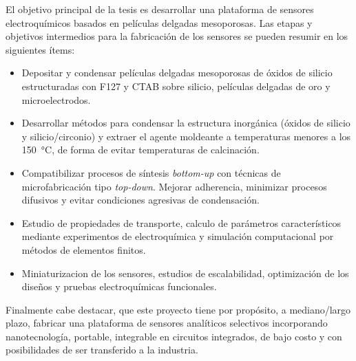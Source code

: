 	El objetivo principal de la tesis es desarrollar una plataforma de sensores electroquímicos basados en películas delgadas mesoporosas. Las etapas y objetivos intermedios para la fabricación de los sensores se pueden resumir en los siguientes ítems:

	\begin{itemize}
		
		\item Depositar y condensar películas delgadas mesoporosas de óxidos de silicio estructuradas con F127 y CTAB sobre silicio, películas delgadas de oro y microelectrodos.  
		
		\item Desarrollar métodos para condensar la estructura inorgánica (óxidos de silicio y silicio/circonio) y extraer el agente moldeante a temperaturas menores a los \SI{150}{\celsius}, de forma de evitar temperaturas de calcinación. 

		\item Compatibilizar procesos de síntesis \textit{bottom-up} con técnicas de microfabricación tipo \textit{top-down}. Mejorar adherencia, minimizar procesos difusivos y evitar condiciones agresivas de condensación.

		\item Estudio de propiedades de transporte, calculo de parámetros característicos mediante experimentos de electroquímica y simulación computacional por métodos de elementos finitos.

		\item Miniaturizacion de los sensores, estudios de escalabilidad, optimización de los diseños y pruebas electroquímicas funcionales.

		\end{itemize}	

	Finalmente cabe destacar, que este proyecto tiene por propósito, a mediano/largo plazo, fabricar una plataforma de sensores analíticos selectivos incorporando nanotecnología, portable, integrable en circuitos integrados, de bajo costo y con posibilidades de ser transferido a la industria.